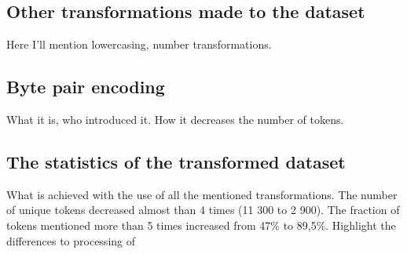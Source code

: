 \subsection{Other transformations made to the dataset}
Here I'll mention lowercasing, number transformations.

\subsection{Byte pair encoding}
What it is, who introduced it. How it decreases the number of tokens.

\subsection{The statistics of the transformed dataset}
What is achieved with the use of all the mentioned transformations. The number of unique tokens decreased almost than 4 times (11 300 to 2 900). The fraction of tokens mentioned more than 5 times increased from 47\% to 89,5\%. Highlight the differences to processing of  
